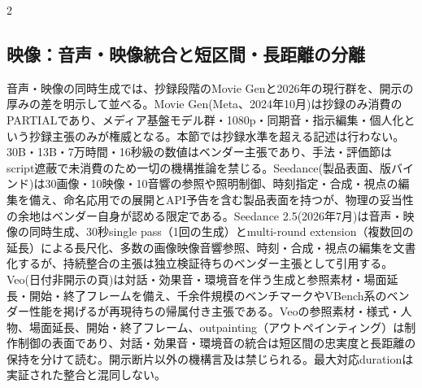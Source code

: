 \documentclass[lualatex,a4paper,10pt]{jlreq}
\begin{document}
\begin{multicols}{2}
\subsection{映像：音声・映像統合と短区間・長距離の分離}
音声・映像の同時生成では、抄録段階のMovie Genと2026年の現行群を、開示の厚みの差を明示して並べる。Movie Gen(Meta、2024年10月)は抄録のみ消費のPARTIALであり、メディア基盤モデル群・1080p・同期音・指示編集・個人化という抄録主張のみが権威となる\autocite{btd076}。本節では抄録水準を超える記述は行わない。30B・13B・7万時間・16秒級の数値はベンダー主張であり、手法・評価節はscript遮蔽で未消費のため一切の機構推論を禁じる。Seedance(製品表面、版バインド)は30画像・10映像・10音響の参照や照明制御、時刻指定・合成・視点の編集を備え、命名応用での展開とAPI予告を含む製品表面を持つが、物理の妥当性の余地はベンダー自身が認める限定である\autocite{btd117}。Seedance 2.5(2026年7月)は音声・映像の同時生成、30秒single pass（1回の生成）とmulti-round extension（複数回の延長）による長尺化、多数の画像映像音響参照、時刻・合成・視点の編集を文書化するが、持続整合の主張は独立検証待ちのベンダー主張として引用する\autocite{btd118}。Veo(日付非開示の頁)は対話・効果音・環境音を伴う生成と参照素材・場面延長・開始・終了フレームを備え、千余件規模のベンチマークやVBench系のベンダー性能を掲げるが再現待ちの帰属付き主張である\autocite{btd119}。Veoの参照素材・様式・人物、場面延長、開始・終了フレーム、outpainting（アウトペインティング）は制作制御の表面であり、対話・効果音・環境音の統合は短区間の忠実度と長距離の保持を分けて読む。開示断片以外の機構言及は禁じられる。最大対応durationは実証された整合と混同しない。


\end{multicols}
\end{document}
